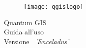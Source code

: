 
\begin{titlepage}
\begin{center}

\begin{figure}[H]
\begin{center}
\texttt{[image: qgislogo]} 
\end{center}
\end{figure}

\Huge{Quantum GIS}\\
\vspace{0.5cm}
\Large{Guida all'uso} \\
\vspace{0.5cm}
\Large{Versione ~\CURRENT \textsl{'Enceladus'}}

\end{center}
\end{titlepage}
